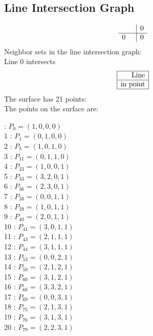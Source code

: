 \documentclass{article}
\begin{document}
{\subsection*{Line Intersection Graph}
{\arraycolsep=1pt
$$
\begin{array}{rr|*{1}r}
 &  & 0\\
\hline
0 &  & 0\\
\end{array}
$$
}%
Neighbor sets in the line intersection graph:\\
Line 0 intersects 
$$
\begin{array}{|r*{0}{|c}|}
\hline
\mbox{Line} \\
\hline
\mbox{in point} \\
\hline
\end{array}
$$
The surface has 21 points:\\
The points on the surface are:\\
\begin{multicols}{3}
 : $P_{0}=( 1, 0, 0, 0 )$\\
1 : $P_{1}=( 0, 1, 0, 0 )$\\
2 : $P_{8}=( 1, 0, 1, 0 )$\\
3 : $P_{11}=( 0, 1, 1, 0 )$\\
4 : $P_{23}=( 1, 0, 0, 1 )$\\
5 : $P_{33}=( 3, 2, 0, 1 )$\\
6 : $P_{36}=( 2, 3, 0, 1 )$\\
7 : $P_{38}=( 0, 0, 1, 1 )$\\
8 : $P_{39}=( 1, 0, 1, 1 )$\\
9 : $P_{40}=( 2, 0, 1, 1 )$\\
10 : $P_{41}=( 3, 0, 1, 1 )$\\
11 : $P_{43}=( 2, 1, 1, 1 )$\\
12 : $P_{44}=( 3, 1, 1, 1 )$\\
13 : $P_{53}=( 0, 0, 2, 1 )$\\
14 : $P_{59}=( 2, 1, 2, 1 )$\\
15 : $P_{60}=( 3, 1, 2, 1 )$\\
16 : $P_{68}=( 3, 3, 2, 1 )$\\
17 : $P_{69}=( 0, 0, 3, 1 )$\\
18 : $P_{75}=( 2, 1, 3, 1 )$\\
19 : $P_{76}=( 3, 1, 3, 1 )$\\
20 : $P_{79}=( 2, 2, 3, 1 )$\\
\end{multicols}


%


%


}%
\end{document}
